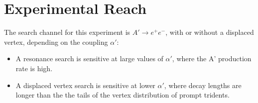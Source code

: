 \documentclass[b1]{sciposter}
\begin{document}
\begin{multicols}{3}
\begin{small}

	
% 
\end{small}
\columnbreak
	\section*{Experimental Reach}
	The search channel for this experiment is $A'\to e^+e^-$, with or without a displaced vertex, depending on the coupling $\alpha'$:
\begin{itemize}

\item A resonance search is sensitive at large values of $\alpha'$, where the A' production rate is high.
\item A displaced vertex search is sensitive at lower $\alpha'$, where decay lengths are longer than the the tails of the vertex distribution of prompt tridents.
\end{itemize}
	

\end{multicols}
\end{document}

